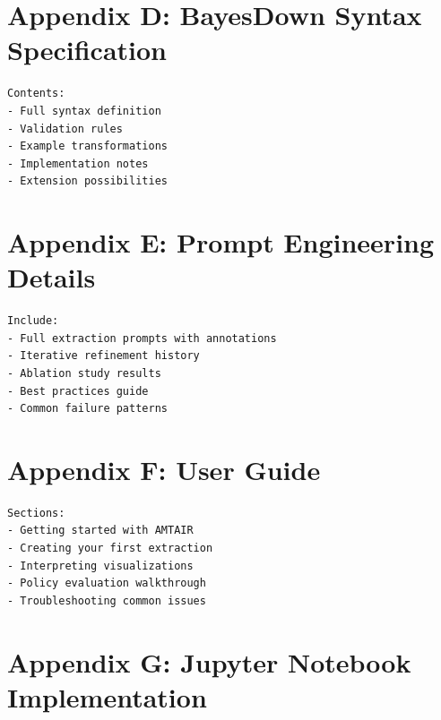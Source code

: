 \documentclass[
  11pt,
  letterpaper,
]{book}
\begin{document}
\section*{Appendix D: BayesDown Syntax
Specification}\label{sec-appendix-bayesdown}


\begin{verbatim}
Contents:
- Full syntax definition
- Validation rules
- Example transformations
- Implementation notes
- Extension possibilities
\end{verbatim}

\section*{Appendix E: Prompt Engineering
Details}\label{sec-appendix-prompts}


\begin{verbatim}
Include:
- Full extraction prompts with annotations
- Iterative refinement history
- Ablation study results
- Best practices guide
- Common failure patterns
\end{verbatim}

\section*{Appendix F: User Guide}\label{sec-appendix-userguide}


\begin{verbatim}
Sections:
- Getting started with AMTAIR
- Creating your first extraction
- Interpreting visualizations
- Policy evaluation walkthrough
- Troubleshooting common issues
\end{verbatim}

\section*{Appendix G: Jupyter Notebook
Implementation}\label{sec-appendix-notebook}

\end{document}
